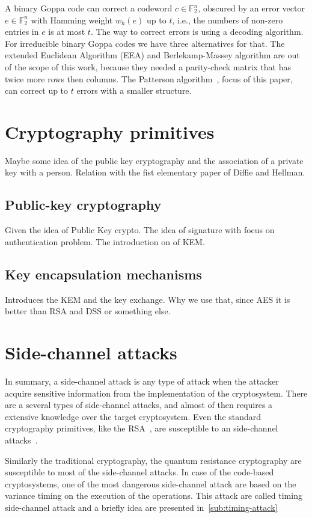 A binary Goppa code can correct a codeword $c \in \mathbb{F}_{2}^n$, obscured by an error vector $e \in \mathbb{F}_{2}^n$ with Hamming weight $w_h(e)$ up to $t$, i.e., the numbers of non-zero entries in $e$ is at most $t$. The way to correct errors is using a decoding algorithm. For irreducible binary Goppa codes we have three alternatives for that. The extended Euclidean Algorithm (EEA) and Berlekamp-Massey algorithm are out of the scope of this work, because they needed a parity-check matrix that has twice more rows then columns. The Patterson algorithm~\cite{patterson1975algebraic}, focus of this paper, can correct up to $t$ errors with a smaller structure.

\section{Cryptography primitives}
Maybe some idea of the public key cryptography and the association of a private key with a person. Relation with the fist elementary paper of Diffie and Hellman.
\subsection{Public-key cryptography}
Given the idea of Public Key crypto. The idea of signature with focus on authentication problem. The introduction on of KEM.
\subsection{Key encapsulation mechanisms}
Introduces the KEM and the key exchange. Why we use that, since AES it is better than RSA and DSS or something else.

\section{Side-channel attacks}
In summary, a side-channel attack is any type of attack when the attacker acquire sensitive information from the implementation of the cryptosystem. There are a several types of side-channel attacks, and almost of then requires a extensive knowledge over the target cryptosystem. Even the standard cryptography primitives, like the RSA~\cite{rivest1978method}, are susceptible to an side-channel attacks~\cite{kocher1996timing}.

Similarly the traditional cryptography, the quantum resistance cryptography are susceptible to most of the side-channel attacks. In case of the code-based cryptosystems, one of the most dangerous side-channel attack are based on the variance timing on the execution of the operations. This attack are called timing side-channel attack and a briefly idea are presented in~\ref{sub:timing-attack}

